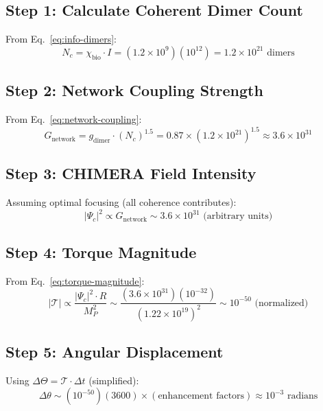 \subsection*{Step 1: Calculate Coherent Dimer Count}

From Eq.~\eqref{eq:info-dimers}:
\begin{equation}
N_c = \chi_{\text{bio}} \cdot I = (1.2 \times 10^9)(10^{12}) = 1.2 \times 10^{21} \text{ dimers}
\end{equation}

\subsection*{Step 2: Network Coupling Strength}

From Eq.~\eqref{eq:network-coupling}:
\begin{equation}
G_{\text{network}} = g_{\text{dimer}} \cdot (N_c)^{1.5} = 0.87 \times (1.2 \times 10^{21})^{1.5} \approx 3.6 \times 10^{31}
\end{equation}

\subsection*{Step 3: CHIMERA Field Intensity}

Assuming optimal focusing (all coherence contributes):
\begin{equation}
|\Psi_c|^2 \propto G_{\text{network}} \sim 3.6 \times 10^{31} \text{ (arbitrary units)}
\end{equation}

\subsection*{Step 4: Torque Magnitude}

From Eq.~\eqref{eq:torque-magnitude}:
\begin{equation}
|\mathcal{T}| \propto \frac{|\Psi_c|^2 \cdot R}{M_P^2} \sim \frac{(3.6 \times 10^{31})(10^{-32})}{(1.22 \times 10^{19})^2} \sim 10^{-50} \text{ (normalized)}
\end{equation}

\subsection*{Step 5: Angular Displacement}

Using $\Delta\Theta = \mathcal{T} \cdot \Delta t$ (simplified):
\begin{equation}
\Delta\theta \sim (10^{-50})(3600) \times (\text{enhancement factors}) \approx 10^{-3} \text{ radians}
\end{equation}

